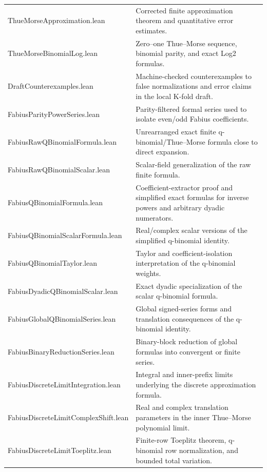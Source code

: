 \documentclass[11pt,a4paper,openany]{book}
\def\module#1{#1.lean}
\newcommand{\module}[1]{\nolinkurl{#1.lean}}
\begin{document}
\begin{longtable}{@{}>{\raggedright\arraybackslash}p{}p{}@{}}
\addlinespace[.28em]
\module{ThueMorseApproximation} & Corrected finite approximation theorem and quantitative error estimates. \\
\addlinespace[.28em]
\module{ThueMorseBinomialLog} & Zero--one Thue--Morse sequence, binomial parity, and exact Log2 formulas. \\
\addlinespace[.28em]
\module{DraftCounterexamples} & Machine-checked counterexamples to false normalizations and error claims in the local K-fold draft. \\
\addlinespace[.28em]
\module{FabiusParityPowerSeries} & Parity-filtered formal series used to isolate even/odd Fabius coefficients. \\
\addlinespace[.28em]
\module{FabiusRawQBinomialFormula} & Unrearranged exact finite q-binomial/Thue--Morse formula close to direct expansion. \\
\addlinespace[.28em]
\module{FabiusRawQBinomialScalar} & Scalar-field generalization of the raw finite formula. \\
\addlinespace[.28em]
\module{FabiusQBinomialFormula} & Coefficient-extractor proof and simplified exact formulas for inverse powers and arbitrary dyadic numerators. \\
\addlinespace[.28em]
\module{FabiusQBinomialScalarFormula} & Real/complex scalar versions of the simplified q-binomial identity. \\
\addlinespace[.28em]
\module{FabiusQBinomialTaylor} & Taylor and coefficient-isolation interpretation of the q-binomial weights. \\
\addlinespace[.28em]
\module{FabiusDyadicQBinomialScalar} & Exact dyadic specialization of the scalar q-binomial formula. \\
\addlinespace[.28em]
\module{FabiusGlobalQBinomialSeries} & Global signed-series forms and translation consequences of the q-binomial identity. \\
\addlinespace[.28em]
\module{FabiusBinaryReductionSeries} & Binary-block reduction of global formulas into convergent or finite series. \\
\addlinespace[.28em]
\module{FabiusDiscreteLimitIntegration} & Integral and inner-prefix limits underlying the discrete approximation formula. \\
\addlinespace[.28em]
\module{FabiusDiscreteLimitComplexShift} & Real and complex translation parameters in the inner Thue--Morse polynomial limit. \\
\addlinespace[.28em]
\module{FabiusDiscreteLimitToeplitz} & Finite-row Toeplitz theorem, q-binomial row normalization, and bounded total variation. \\

\end{longtable}
\end{document}
